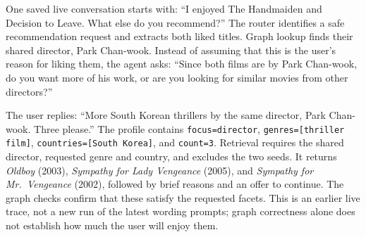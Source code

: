 \documentclass{article}
\begin{document}
\begin{center}
\end{center}

One saved live conversation starts with: ``I enjoyed The Handmaiden
and Decision to Leave. What else do you recommend?'' The router identifies a safe
recommendation request and extracts both liked titles. Graph lookup finds their
shared director, Park Chan-wook. Instead of assuming that this is the user's
reason for liking them, the agent asks: ``Since both films are by Park Chan-wook,
do you want more of his work, or are you looking for similar movies from other
directors?''

The user replies: ``More South Korean thrillers by the same director,
Park Chan-wook. Three please.'' The profile contains
\texttt{focus=director}, \texttt{genres=[thriller film]},
\texttt{countries=[South Korea]}, and \texttt{count=3}. Retrieval requires
the shared director, requested genre and country, and excludes the two seeds.
It returns \emph{Oldboy} (2003), \emph{Sympathy for Lady Vengeance} (2005), and
\emph{Sympathy for Mr.\ Vengeance} (2002), followed by brief reasons and an offer
to continue. The graph checks confirm that these satisfy the requested facets.
This is an earlier live trace, not a new run of the latest wording prompts;
graph correctness alone does not establish how much the user will enjoy them.
\end{document}
